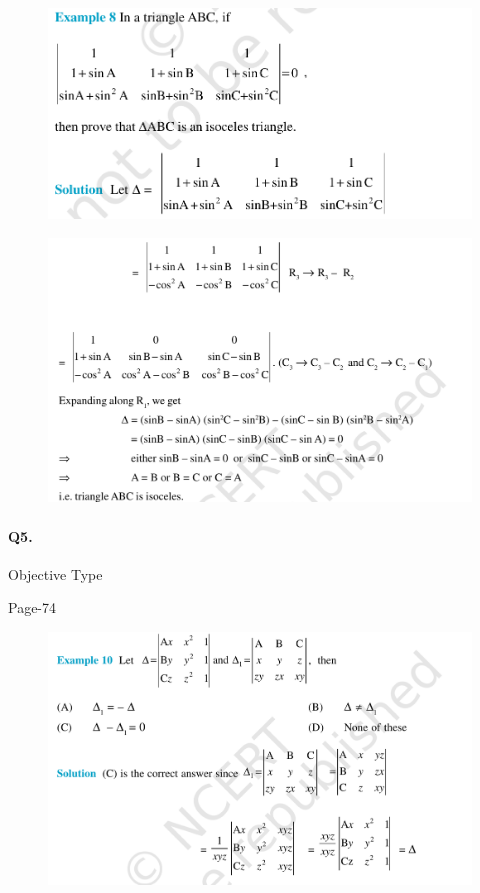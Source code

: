 \documentclass{article}
\begin{document}
\begin{figure}[H]
    \includegraphics[scale=0.5]{determinants_l2_ps_41.png}
\end{figure}
\begin{figure}[H]
    \includegraphics[scale=0.5]{determinants_l2_ps_42.png}
\end{figure}

\paragraph{Q5.}Objective Type
\begin{flushright}
Page-74
\end{flushright}

\begin{figure}[H]
    \includegraphics[scale=0.5]{determinants_l2_ps_5.png}
\end{figure}
\end{document}
